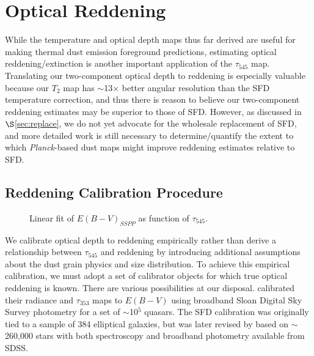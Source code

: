 \documentclass{emulateapj}
\newcommand{\PLANCK}{{\it Planck}}
\begin{document}


\section{Optical Reddening}
\label{sec:ebv}

While the temperature and optical depth maps thus far derived are
useful for making thermal dust emission foreground predictions, estimating 
optical reddening/extinction is another important application of the 
$\tau_{545}$ map. Translating our two-component optical depth to reddening
is especially valuable because our $T_2$ map has $\sim$13$\times$ better
angular resolution than the SFD temperature correction, and thus there is 
reason to believe our two-component reddening estimates may be superior to
those of SFD. However, as discussed in $\S$\ref{sec:replace}, we do not yet 
advocate for the wholesale replacement of SFD, and more detailed work is still 
necessary to determine/quantify the extent to which \PLANCK-based dust maps
might improve reddening estimates relative to SFD.


\subsection{Reddening Calibration Procedure}

\begin{figure}
\begin{center}
\caption{\label{fig:calib} Linear fit of $E(B-V)_{SSPP}$ as function of
$\tau_{545}$.}
\end{center}
\end{figure}

We calibrate optical depth to reddening empirically rather than derive a 
relationship between $\tau_{545}$ and reddening by introducing additional 
assumptions about the dust grain physics and size distribution. To achieve this
empirical calibration, we must adopt a set of calibrator objects for which true
optical reddening is known. There are various possibilities at our disposal. 
\cite{planckdust} calibrated their radiance and $\tau_{353}$ maps to $E(B-V)$ 
using broadband Sloan Digital Sky Survey \citep[SDSS;][]{sdss} photometry for a
set of $\sim$10$^5$ quasars. The SFD calibration was originally tied to a 
sample of 384 elliptical galaxies, but was later revised by 
\citet[hereafter SF11]{schlafly11} based on $\sim$260,000 stars with both 
spectroscopy and broadband photometry available from SDSS.
\end{document}
